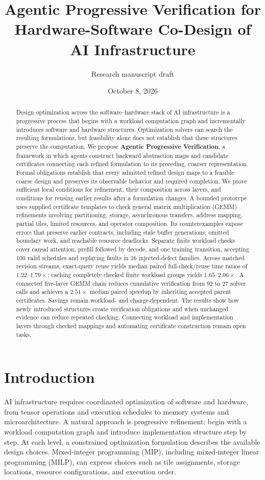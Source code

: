 \documentclass[11pt]{article}
\title{Agentic Progressive Verification for Hardware-Software Co-Design of AI Infrastructure}
\author{Research manuscript draft}
\date{October 8, 2026}
\begin{document}
\maketitle

\begin{abstract}
Design optimization across the software--hardware stack of AI infrastructure is a progressive process that begins with a workload computation graph and incrementally introduces software and hardware structures. Optimization solvers can search the resulting formulations, but feasibility alone does not establish that these structures preserve the computation. We propose \textbf{Agentic Progressive Verification}, a framework in which agents construct backward abstraction maps and candidate certificates connecting each refined formulation to its preceding, coarser representation. Formal obligations establish that every admitted refined design maps to a feasible coarse design and preserves its observable behavior and required completion. We prove sufficient local conditions for refinement, their composition across layers, and conditions for reusing earlier results after a formulation changes. A bounded prototype uses supplied certificate templates to check general matrix multiplication (GEMM) refinements involving partitioning, storage, asynchronous transfers, address mapping, partial tiles, limited resources, and operator composition. Its counterexamples expose errors that preserve earlier contracts, including stale buffer generations, omitted boundary work, and reachable resource deadlocks. Separate finite workload checks cover causal attention, prefill followed by decode, and one training transition, accepting 100 valid schedules and replaying faults in 16 injected-defect families. Across matched revision streams, exact-query reuse yields median paired full-check/reuse time ratios of $1.22$--$1.79\times$; caching completely checked finite workload groups yields $1.65$--$2.06\times$. A connected five-layer GEMM chain reduces cumulative verification from 92 to 27 solver calls and achieves a $2.51\times$ median paired speedup by inheriting accepted parent certificates. Savings remain workload- and change-dependent. The results show how newly introduced structures create verification obligations and when unchanged evidence can reduce repeated checking. Connecting workload and implementation layers through checked mappings and automating certificate construction remain open tasks.
\end{abstract}

\section{Introduction}
AI infrastructure requires coordinated optimization of software and hardware, from tensor operations and execution schedules to memory systems and microarchitecture. A natural approach is progressive refinement: begin with a workload computation graph and introduce implementation structure step by step. At each level, a constrained optimization formulation describes the available design choices. Mixed-integer programming (MIP), including mixed-integer linear programming (MILP), can express choices such as tile assignments, storage locations, resource configurations, and execution order.
\end{document}
